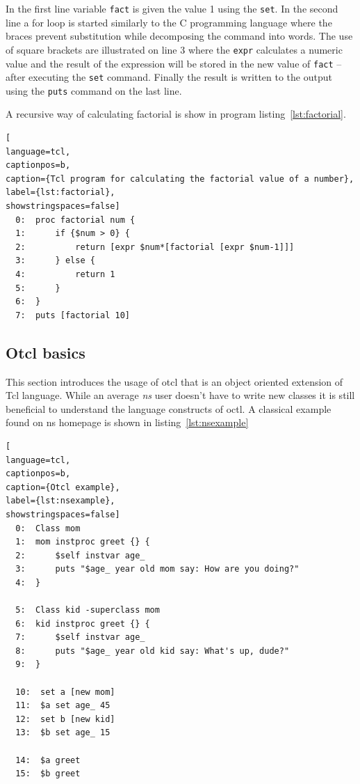 \documentclass[a4paper]{article}
\begin{document}
In the first line variable \verb!fact! is given the value 1 using the \verb!set!. In the second line a for loop is started similarly to the C programming language where the braces prevent substitution while decomposing the command into words. The use of square brackets are illustrated on line 3 where the \verb!expr! calculates a numeric value and the result of the expression will be stored in the new value of \verb!fact! -- after executing the \verb!set! command. Finally the result is written to the output using the \verb!puts! command on the last line.

A recursive way of calculating factorial is show in program listing~\ref{lst:factorial}.

\begin{lstlisting}[
language=tcl,
captionpos=b,
caption={Tcl program for calculating the factorial value of a number},
label={lst:factorial},
showstringspaces=false]
  0:  proc factorial num {
  1:      if {$num > 0} {
  2:          return [expr $num*[factorial [expr $num-1]]]
  3:      } else {
  4:          return 1
  5:      }
  6:  }
  7:  puts [factorial 10]
\end{lstlisting}

\subsection{Otcl basics}

This section introduces the usage of otcl that is an object oriented extension of Tcl language. While an average \emph{ns} user doesn't have to write new classes it is still beneficial to understand the language constructs of octl.
A classical example found on ns homepage is shown in listing~\ref{lst:nsexample}


\begin{lstlisting}[
language=tcl,
captionpos=b,
caption={Otcl example},
label={lst:nsexample},
showstringspaces=false]
  0:  Class mom
  1:  mom instproc greet {} {
  2:      $self instvar age_
  3:      puts "$age_ year old mom say: How are you doing?"
  4:  }

  5:  Class kid -superclass mom
  6:  kid instproc greet {} {
  7:      $self instvar age_
  8:      puts "$age_ year old kid say: What's up, dude?"
  9:  }

  10:  set a [new mom]
  11:  $a set age_ 45
  12:  set b [new kid]
  13:  $b set age_ 15

  14:  $a greet
  15:  $b greet
\end{lstlisting}
\end{document}
